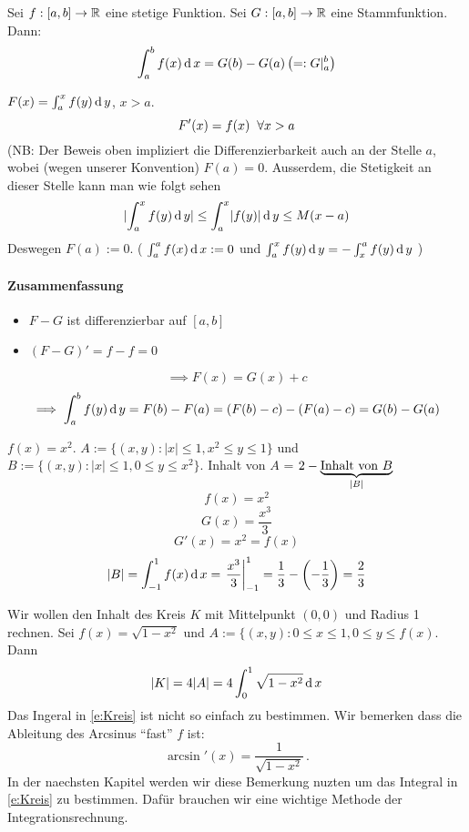 \begin{Kor}
  Sei $f:[a,b]\to\mathbb{R}$ eine stetige Funktion. Sei $G:[a,b]\to\mathbb{R}$ eine Stammfunktion. Dann:
  \[\int_a^bf(x)\operatorname{d} x=G(b)-G(a)\left( =:G|_a^b \right)\]
\end{Kor}
\begin{Bew} $F(x)=\int_a^xf(y)\operatorname{d} y$, $x>a$. 
\[F'(x)=f(x)\hspace{2mm}\forall x>a\]
(NB: Der Beweis oben impliziert die Differenzierbarkeit auch an der Stelle $a$, 
wobei (wegen unserer Konvention) $F(a)=0$. Ausserdem, die Stetigkeit an dieser Stelle
kann man wie folgt sehen  
  \[\mathopen| \int_a^xf(y)\operatorname{d} y \mathclose|\leq \int_a^x\mathopen| f(y) \mathclose|\operatorname{d} y\leq M(x-a)\]
  Deswegen $F(a):=0$. ( $\int_a^af(x)\operatorname{d} x:= 0$ und $\int_a^xf(y)\operatorname{d} y=-\int_x^af(y)\operatorname{d} y$ )
\paragraph{Zusammenfassung}
\begin{itemize}
  \item $F-G$ ist differenzierbar auf $[a,b]$
  \item $(F-G)'=f-f=0$
\end{itemize}
\[\implies F(x)=G(x)+c\]
\[\implies \int_a^bf(y)\operatorname{d} y=F(b)-F(a)=(F(b)-c)-(F(a)-c)=G(b)-G(a)\]
\end{Bew}
\begin{Bsp}
  $f(x)=x^2$. $A:= \{(x,y): |x|\leq 1, x^2\leq y\leq 1\}$ 
und $B:= \{(x,y): |x|\leq 1, 0\leq y \leq x^2\}$.
  Inhalt von $A$ = $2-\underbrace{\text{Inhalt von }B}_{ \mathopen|  B  \mathclose| }$
  \[f(x)=x^2\]
  \[G(x)=\frac{x^3}{3}\]
  \[G'(x)=x^2=f(x)\]
  \[\mathopen| B \mathclose|=\int_{-1}^1f(x)\operatorname{d} x=\left.\frac{x^3}{3}\right|_{-1}^1=\frac{1}{3}-\left( -\frac{1}{3} \right)=\frac{2}{3}\]
\end{Bsp}
\begin{Bsp}\label{b:Kreis} Wir wollen den Inhalt des Kreis $K$ mit Mittelpunkt $(0,0)$ und Radius 1 
rechnen. Sei $f(x)=\sqrt{1-x^2}$ und $A:= \{(x,y): 0\leq x\leq 1, 0\leq y\leq f(x)$. Dann
\begin{equation}\label{e:Kreis}
|K| = 4 |A|= 4 \int_0^1\sqrt{1-x^2}\operatorname{d} x
 \end{equation}
Das Ingeral in \eqref{e:Kreis} ist nicht so einfach zu bestimmen. Wir bemerken
dass die Ableitung des Arcsinus ``fast'' $f$ ist: 
  \[\arcsin'(x)=\frac{1}{\sqrt{1-x^2}}\, .\]
In der naechsten Kapitel werden wir diese Bemerkung nuzten um das Integral
in \eqref{e:Kreis} zu bestimmen. Daf\"ur brauchen wir eine wichtige Methode
der Integrationsrechnung.
\end{Bsp}
